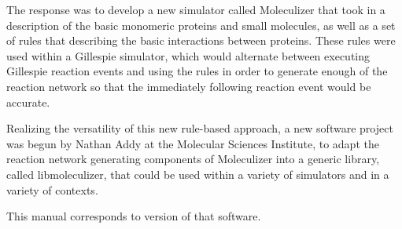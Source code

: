 The response was to develop a new simulator called Moleculizer that
took in a description of the basic monomeric proteins and small
molecules, as well as a set of rules that describing the basic
interactions between proteins. These rules were used within a
Gillespie simulator, which would alternate between executing Gillespie
reaction events and using the rules in order to generate enough of the
reaction network so that the immediately following reaction event
would be accurate.  

Realizing the versatility of this new rule-based approach, a new
software project was begun by Nathan Addy at the Molecular Sciences
Institute, to adapt the reaction network generating components of
Moleculizer into a generic library, called libmoleculizer, that could
be used within a variety of simulators and in a variety of contexts.

This manual corresponds to version \currentversion of that software. 